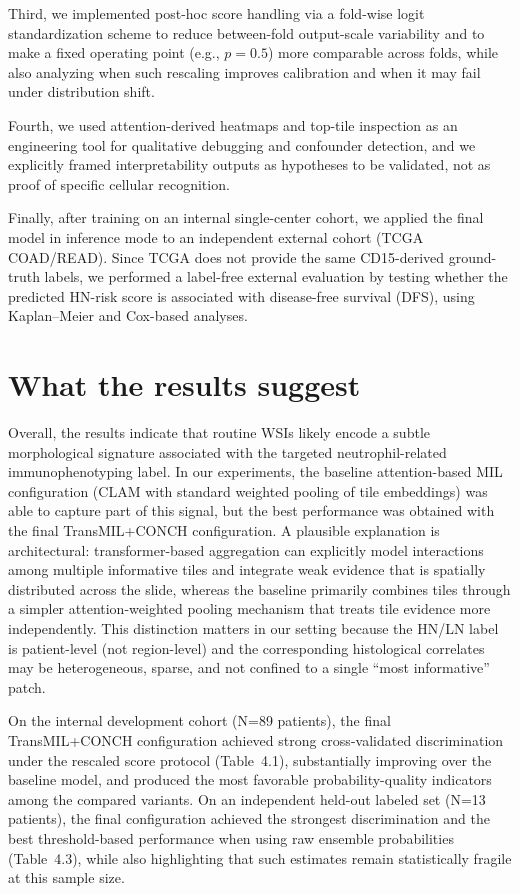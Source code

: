 Third, we implemented post-hoc score handling via a fold-wise logit standardization scheme to reduce between-fold output-scale variability and to make a fixed operating point (e.g., $p=0.5$) more comparable across folds, while also analyzing when such rescaling improves calibration and when it may fail under distribution shift.

Fourth, we used attention-derived heatmaps and top-tile inspection as an engineering tool for qualitative debugging and confounder detection, and we explicitly framed interpretability outputs as hypotheses to be validated, not as proof of specific cellular recognition.

Finally, after training on an internal single-center cohort, we applied the final model in inference mode to an independent external cohort (TCGA COAD/READ). Since TCGA does not provide the same CD15-derived ground-truth labels, we performed a label-free external evaluation by testing whether the predicted HN-risk score is associated with disease-free survival (DFS), using Kaplan--Meier and Cox-based analyses.

\section{What the results suggest}
Overall, the results indicate that routine WSIs likely encode a subtle morphological signature associated with the targeted neutrophil-related immunophenotyping label. In our experiments, the baseline attention-based MIL configuration (CLAM with standard weighted pooling of tile embeddings) was able to capture part of this signal, but the best performance was obtained with the final TransMIL+CONCH configuration. A plausible explanation is architectural: transformer-based aggregation can explicitly model interactions among multiple informative tiles and integrate weak evidence that is spatially distributed across the slide, whereas the baseline primarily combines tiles through a simpler attention-weighted pooling mechanism that treats tile evidence more independently. This distinction matters in our setting because the HN/LN label is patient-level (not region-level) and the corresponding histological correlates may be heterogeneous, sparse, and not confined to a single “most informative” patch.


On the internal development cohort (N=89 patients), the final TransMIL+CONCH configuration achieved strong cross-validated discrimination under the rescaled score protocol (Table~4.1), substantially improving over the baseline model, and produced the most favorable probability-quality indicators among the compared variants.
On an independent held-out labeled set (N=13 patients), the final configuration achieved the strongest discrimination and the best threshold-based performance when using raw ensemble probabilities (Table~4.3), while also highlighting that such estimates remain statistically fragile at this sample size.

